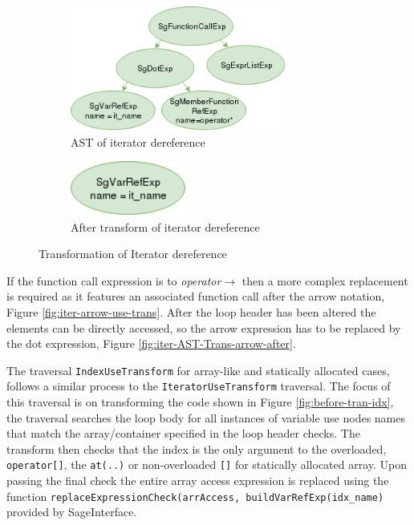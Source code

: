 \documentclass[bsc,frontabs,singlespacing,twoside,parskip,deptreport]{infthesis}
\begin{document}
\begin{figure}[H]
    \begin{subfigure}[b]{0.5\textwidth}
        \centering
            \includegraphics[height=4.1cm]{images/iterator-deref-replace-ast.png}
        \caption{AST of iterator dereference}
        \label{fig:iter-AST-Trans-deref-before}
    \end{subfigure}
    \hfill
    \begin{subfigure}[b]{0.5\textwidth}
        \centering
            \includegraphics[width=0.42\textwidth]{images/single-varRef-node.png}
        \caption{After transform of iterator dereference}
        \label{fig:iter-AST-Trans-deref-after}
    \end{subfigure}
    \vspace{-0.5cm}
    \caption{Transformation of Iterator dereference}
    \label{fig:iter-deref-use-trans}
\end{figure}


If the function call expression is to \textit{operator$\rightarrow$} then a more complex replacement is required as it features an associated function call after the arrow notation, Figure \ref{fig:iter-arrow-use-trans}. After the loop header has been altered the elements can be directly accessed, so the arrow expression has to be replaced by the dot expression, Figure \ref{fig:iter-AST-Trans-arrow-after}. 

The traversal \texttt{IndexUseTransform} for array-like and statically allocated cases, follows a similar process to the \texttt{IteratorUseTransform} traversal. The focus of this traversal is on transforming the code shown in Figure \ref{fig:before-tran-idx}, the traversal searches the loop body for all instances of variable use nodes names that match the array/container specified in the loop header checks. The transform then checks that the index is the only argument to the overloaded, \texttt{operator[]}, the \texttt{at(..)} or non-overloaded \texttt{[]} for statically allocated array. Upon passing the final check the entire array access expression  is replaced using the function \texttt{replaceExpressionCheck(arrAccess, buildVarRefExp(idx\_name)} provided by SageInterface.
\end{document}

